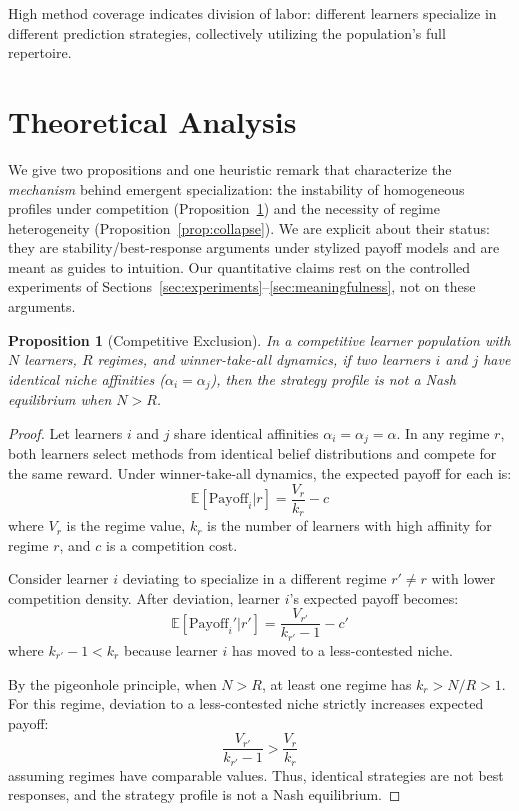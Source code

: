 \documentclass{article}
\newtheorem{proposition}{Proposition}
\newcommand{\E}{\mathbb{E}}
\begin{document}
High method coverage indicates division of labor: different learners specialize in different prediction strategies, collectively utilizing the population's full repertoire.

\section{Theoretical Analysis}

We give two propositions and one heuristic remark that characterize the
\emph{mechanism} behind emergent specialization: the instability of homogeneous
profiles under competition (Proposition~\ref{prop:exclusion}) and the necessity of
regime heterogeneity (Proposition~\ref{prop:collapse}). We are explicit about their
status: they are stability/best-response arguments under stylized payoff models and
are meant as guides to intuition. Our quantitative claims rest on the controlled
experiments of Sections~\ref{sec:experiments}--\ref{sec:meaningfulness}, not on
these arguments.

\begin{proposition}[Competitive Exclusion]
\label{prop:exclusion}
In a competitive learner population with $N$ learners, $R$ regimes, and winner-take-all dynamics, if two learners $i$ and $j$ have identical niche affinities ($\alpha_i = \alpha_j$), then the strategy profile is not a Nash equilibrium when $N > R$.
\end{proposition}

\begin{proof}
Let learners $i$ and $j$ share identical affinities $\alpha_i = \alpha_j = \alpha$. In any regime $r$, both learners select methods from identical belief distributions and compete for the same reward. Under winner-take-all dynamics, the expected payoff for each is:
\begin{equation}
    \E[\text{Payoff}_i | r] = \frac{V_r}{k_r} - c
\end{equation}
where $V_r$ is the regime value, $k_r$ is the number of learners with high affinity for regime $r$, and $c$ is a competition cost.

Consider learner $i$ deviating to specialize in a different regime $r' \neq r$ with lower competition density. After deviation, learner $i$'s expected payoff becomes:
\begin{equation}
    \E[\text{Payoff}_i' | r'] = \frac{V_{r'}}{k_{r'} - 1} - c'
\end{equation}
where $k_{r'} - 1 < k_r$ because learner $i$ has moved to a less-contested niche.

By the pigeonhole principle, when $N > R$, at least one regime has $k_r > N/R > 1$. For this regime, deviation to a less-contested niche strictly increases expected payoff:
\begin{equation}
    \frac{V_{r'}}{k_{r'} - 1} > \frac{V_r}{k_r}
\end{equation}
assuming regimes have comparable values. Thus, identical strategies are not best responses, and the strategy profile is not a Nash equilibrium.
\end{proof}
\end{document}
